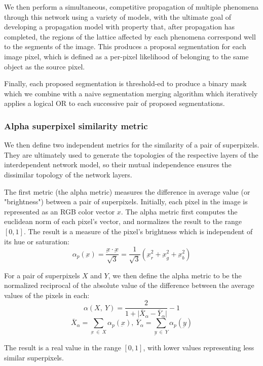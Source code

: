 \documentclass[twocolumn]{article}
\begin{document}
We then perform a simultaneous, competitive propagation of multiple
phenomena through this network using a variety of models, with the ultimate goal
of developing a propagation model with property that, after propagation has
completed, the regions of the lattice affected by each phenomena correspond well
to the segments of the image. This produces a proposal segmentation for each
image pixel, which is defined as a per-pixel likelihood of belonging to the same
object as the source pixel.

Finally, each proposed segmentation is threshold-ed to produce a binary mask
which we combine with a naive segmentation merging algorithm which iteratively
applies a logical OR to each successive pair of proposed segmentations. 

\subsubsection{Alpha superpixel similarity metric}

We then define two independent metrics for the similarity of a pair of superpixels. They are ultimately used to generate the topologies of the respective layers of the interdependent network model, so their mutual independence ensures the dissimilar topology of the network layers.

The first metric (the alpha metric) measures the difference in average value (or "brightness") between a pair of superpixels. Initially, each pixel in the image is represented as an RGB color vector $x$. The alpha metric first computes the euclidean norm of each pixel's vector, and normalizes the result to the range $[0, 1]$. The result is a measure of the pixel's brightness which is independent of its hue or saturation:
\[
    \alpha_p(\underbar{x}) = \frac{\underbar{x} \cdot \underbar{x}}{\sqrt{3}} = \frac{1}{\sqrt{3}}(\underbar{x}_r^2+\underbar{x}_g^2+\underbar{x}_b^2)
\]

For a pair of superpixels $X$ and $Y$, we then define the alpha metric to be the normalized reciprocal of the absolute value of the difference between the average values of the pixels in each:
\[
    \alpha(X,\: Y) = \frac{2}{1 + \lvert \bar{X}_\alpha - \bar{Y}_\alpha \rvert} - 1
\]
\[
    \bar{X}_\alpha = \sum\limits_{\underbar{x}\: \in\: X} \alpha_p(\underbar{x}),\ \bar{Y}_\alpha = \sum\limits_{\underbar{y}\: \in\: Y} \alpha_p(\underbar{y})
\]

The result is a real value in the range $[0, 1]$, with lower values representing less similar superpixels.
\end{document}
